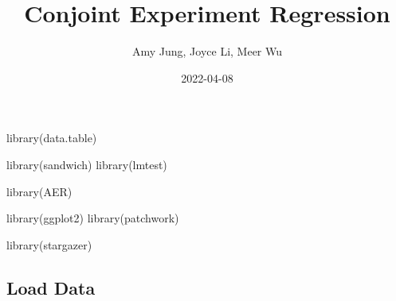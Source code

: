 \documentclass[
]{article}
\title{Conjoint Experiment Regression}
\author{Amy Jung, Joyce Li, Meer Wu}
\date{2022-04-08}
\newenvironment{Shaded}{\begin{snugshade}}{\end{snugshade}}
\newcommand{\FunctionTok}[1]{\textcolor[rgb]{0.00,0.00,0.00}{#1}}
\newcommand{\NormalTok}[1]{#1}
\begin{document}
\maketitle

\begin{Shaded}
\begin{Highlighting}[]
\FunctionTok{library}\NormalTok{(data.table)}

\FunctionTok{library}\NormalTok{(sandwich)}
\FunctionTok{library}\NormalTok{(lmtest)}

\FunctionTok{library}\NormalTok{(AER) }

\FunctionTok{library}\NormalTok{(ggplot2) }
\FunctionTok{library}\NormalTok{(patchwork)}

\FunctionTok{library}\NormalTok{(stargazer)}
\end{Highlighting}
\end{Shaded}

\hypertarget{load-data}{%
\subsection{Load Data}\label{load-data}}
\end{document}

